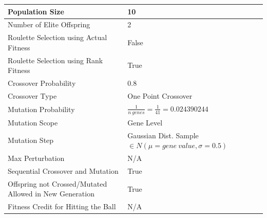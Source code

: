 \documentclass[a4paper,10pt]{article}
\begin{document}
\begin{table}[H]
\centering
\footnotesize
\begin{tabular}{ |>{\columncolor[gray]{0.8}} l | l| }
\hline
Population Size                                                      & 10                                                                \\ \hline
Number of Elite Offspring                                            & 2                                                                 \\ \hline
Roulette Selection using Actual Fitness                              & False                                                             \\ \hline
Roulette Selection using Rank Fitness                                & True                                                              \\ \hline
Crossover Probability                                                & 0.8                                                               \\ \hline
Crossover Type                                                       & One Point Crossover                                               \\ \hline
Mutation Probability                                                 & $\frac{1}{n \ genes}=\frac{1}{41} = 0.024390244$                  \\ \hline
Mutation Scope                                                       & Gene Level                                                        \\ \hline
Mutation Step                                                        & Gaussian Dist. Sample $\in N(\mu=gene \ value, \sigma = 0.5)$     \\ \hline
Max Perturbation                                                     & N/A                                                       	       \\ \hline
Sequential Crossover and Mutation                                    & True                                                      	       \\ \hline
Offspring not Crossed/Mutated Allowed in New Generation              & True                                                     	       \\ \hline
Fitness Credit for Hitting the Ball                                  & N/A                                                      	       \\ \hline

\end{tabular}
\end{table}
\end{document}
